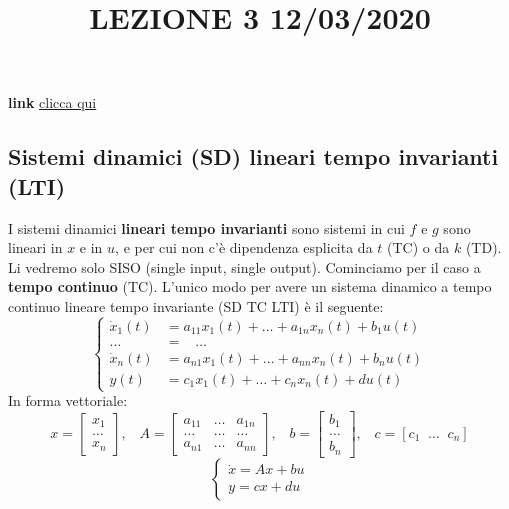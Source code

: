 \title{LEZIONE 3 12/03/2020}\newline
\textbf{link} \href{https://web.microsoftstream.com/video/0f5f35c0-ba36-4f9c-a496-057ebab138ec?list=user&userId=faa91214-a6f5-40d7-8875-253fd49b8ce1}{clicca qui}
\subsection{Sistemi dinamici (SD) lineari tempo invarianti (LTI)}
I sistemi dinamici \textbf{lineari tempo invarianti} sono sistemi in cui $f$ e $g$ sono lineari in $x$ e in $u$, e per cui non c'è dipendenza esplicita da $t$ (TC) o da $k$ (TD).\newline
\newline
Li vedremo solo SISO (single input, single output).\newline
\newline
Cominciamo per il caso a \textbf{tempo continuo} (TC). L'unico modo per avere un sistema dinamico a tempo continuo lineare tempo invariante (SD TC LTI) è il seguente:
\[
    \begin{cases}
        \dot{x}_1(t) &= a_{11}x_1(t) + \dots+ a_{1n}x_{n}(t) + b_1 u(t)\\
        \dots &= \;\;\; \dots\\
        \dot{x}_n(t) &= a_{n1}x_1(t) +\dots+ a_{nn}x_n(t) + b_nu(t)\\
        y(t) &= c_1x_1(t) + \dots + c_n x_n(t) + d u(t)
    \end{cases}
\]
In forma vettoriale:
\[
    x = \left[\begin{matrix}
        x_1\\
        \dots\\
        x_n
    \end{matrix}\right], \;\;\; A = \left[\begin{matrix}
        a_{11} & \dots & a_{1n}\\
        \dots & \dots & \dots\\
        a_{n1} & \dots & a_{nn}
    \end{matrix}\right], \;\;\; b = \left[\begin{matrix}
        b_1\\
        \dots\\
        b_n
    \end{matrix}\right], \;\;\; c = [c_1 \;\; \dots \;\; c_n]
\]
\[
    \begin{cases}
        \dot{x} = Ax+bu\\
        y = cx +du
    \end{cases}
\]
